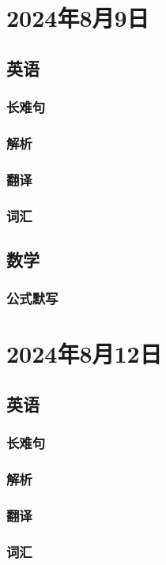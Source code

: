 \documentclass[UTF8]{ctexart}
\begin{document}
\section{2024年8月9日}
\subsection{英语}
\subsubsection{长难句}
\subsubsection{解析}
\subsubsection{翻译}
\subsubsection{词汇}
\subsection{数学}
\subsubsection{公式默写}
\begin{multicols}{2}
\end{multicols}
\section{2024年8月12日}
\subsection{英语}
\subsubsection{长难句}
\subsubsection{解析}
\subsubsection{翻译}
\subsubsection{词汇}
\end{document}
